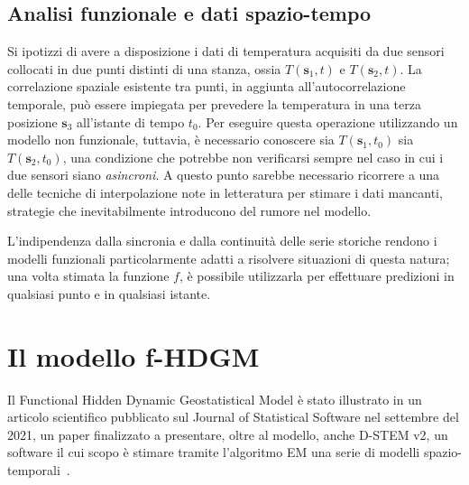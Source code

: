 \subsection[Analisi funzionale e dati spazio-tempo]{Analisi funzionale e dati spazio-tempo}
Si ipotizzi di avere a disposizione i dati di temperatura acquisiti da due sensori collocati in due punti distinti di una stanza, ossia $T(\mathbf{s}_1, t)$ e $T(\mathbf{s}_2, t)$. La correlazione spaziale esistente tra punti, in aggiunta all'autocorrelazione temporale, può essere impiegata per prevedere la temperatura in una terza posizione $\mathbf{s}_3$ all'istante di tempo $t_0$. Per eseguire questa operazione utilizzando un modello non funzionale, tuttavia, è necessario conoscere sia $T(\mathbf{s}_1, t_0)$ sia $T(\mathbf{s}_2, t_0)$, una condizione che potrebbe non verificarsi sempre nel caso in cui i due sensori siano \textit{asincroni}. A questo punto sarebbe necessario ricorrere a una delle tecniche di interpolazione note in letteratura per stimare i dati mancanti, strategie che inevitabilmente introducono del rumore nel modello. \par L'indipendenza dalla sincronia e dalla continuità delle serie storiche rendono i modelli funzionali particolarmente adatti a risolvere situazioni di questa natura; una volta stimata la funzione $f$, è possibile utilizzarla per effettuare predizioni in qualsiasi punto e in qualsiasi istante.

\section[Il modello f-HDGM]{Il modello f-HDGM}
Il Functional Hidden Dynamic Geostatistical Model è stato illustrato in un articolo scientifico pubblicato sul Journal of Statistical Software nel settembre del \num{2021}, un paper finalizzato a presentare, oltre al modello, anche D-STEM v2, un software il cui scopo è stimare tramite l'algoritmo EM una serie di modelli spazio-temporali~\cite{paper_f_HDGM}.

